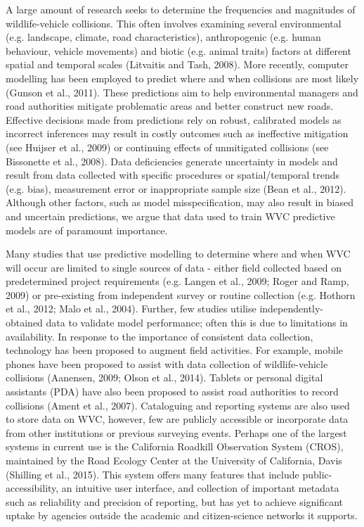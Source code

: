 A large amount of research seeks to determine the frequencies and magnitudes of wildlife-vehicle collisions. This often involves examining several environmental (e.g. landscape, climate, road characteristics), anthropogenic (e.g. human behaviour, vehicle movements) and biotic (e.g. animal traits) factors at different spatial and temporal scales (Litvaitis and Tash, 2008). More recently, computer modelling has been employed to predict where and when collisions are most likely (Gunson et al., 2011). These predictions aim to help environmental managers and road authorities mitigate problematic areas and better construct new roads. Effective decisions made from predictions rely on robust, calibrated models as incorrect inferences may result in costly outcomes such as ineffective mitigation (see Huijser et al., 2009) or continuing effects of unmitigated collisions (see Bissonette et al., 2008). Data deficiencies generate uncertainty in models and result from data collected with specific procedures or spatial/temporal trends (e.g. bias), measurement error or inappropriate sample size (Bean et al., 2012).  Although other factors, such as model misspecification, may also result in biased and uncertain predictions, we argue that data used to train WVC predictive models are of paramount importance.

Many studies that use predictive modelling to determine where and when WVC will occur are limited to single sources of data - either field collected based on predetermined project requirements (e.g. Langen et al., 2009; Roger and Ramp, 2009) or pre-existing from independent survey or routine collection (e.g. Hothorn et al., 2012; Malo et al., 2004). Further, few studies utilise independently-obtained data to validate model performance; often this is due to limitations in availability. In response to the importance of consistent data collection, technology has been proposed to augment field activities. For example, mobile phones have been proposed to assist with data collection of wildlife-vehicle collisions (Aanensen, 2009; Olson et al., 2014). Tablets or personal digital assistants (PDA) have also been proposed to assist road authorities to record collisions (Ament et al., 2007). Cataloguing and reporting systems are also used to store data on WVC, however, few are publicly accessible or incorporate data from other institutions or previous surveying events. Perhaps one of the largest systems in current use is the California Roadkill Observation System (CROS), maintained by the Road Ecology Center at the University of California, Davis (Shilling et al., 2015). This system offers many features that include public-accessibility, an intuitive user interface, and collection of important metadata such as reliability and precision of reporting, but has yet to achieve significant uptake by agencies outside the academic and citizen-science networks it supports.

